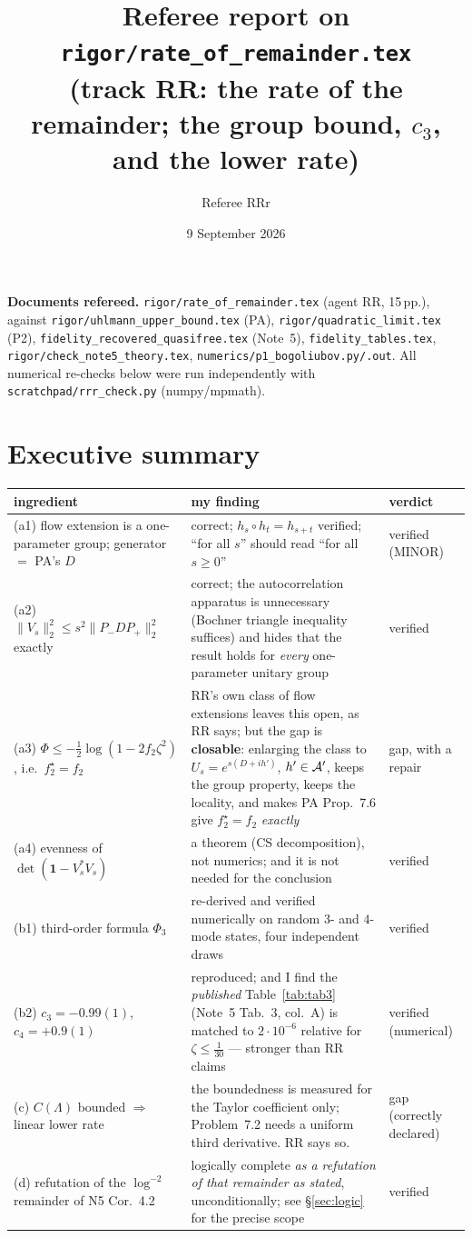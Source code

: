 \documentclass[11pt]{article}
\title{Referee report on \texttt{rigor/rate\_of\_remainder.tex}\\
\large (track RR: the rate of the remainder; the group bound, $c_3$, and the lower rate)}
\author{Referee RRr}\date{9 September 2026}
\newcommand{\Pp}{P_+}\newcommand{\Pm}{P_-}\newcommand{\Om}{\Omega}\newcommand{\one}{\mathbf 1}
\newcommand{\norm}[1]{\lVert#1\rVert}\newcommand{\abs}[1]{\lvert#1\rvert}
\begin{document}
\maketitle

\noindent\textbf{Documents refereed.}  \texttt{rigor/rate\_of\_remainder.tex} (agent RR, 15\,pp.),
against \texttt{rigor/uhlmann\_upper\_bound.tex} (PA), \texttt{rigor/quadratic\_limit.tex} (P2),
\texttt{fidelity\_recovered\_quasifree.tex} (Note~5), \texttt{fidelity\_tables.tex},
\texttt{rigor/check\_note5\_theory.tex}, \texttt{numerics/p1\_bogoliubov.py/.out}.  All numerical
re-checks below were run independently with
\texttt{scratchpad/rrr\_check.py} (numpy/mpmath).

\section*{Executive summary}
\begin{center}\small
\begin{tabular}{p{}p{}l}\toprule
ingredient & my finding & verdict\\\midrule
(a1) flow extension is a one-parameter group; generator $=$ PA's $D$ &
 correct; $h_s\circ h_t=h_{s+t}$ verified; ``for all $s$'' should read ``for all $s\ge0$'' &
 verified (MINOR)\\
(a2) $\norm{V_s}_2^2\le s^2\norm{\Pm D\Pp}_2^2$ exactly &
 correct; the autocorrelation apparatus is unnecessary (Bochner triangle inequality suffices) and
 hides that the result holds for \emph{every} one-parameter unitary group & verified\\
(a3) $\Phi\le-\frac12\log(1-2f_2\zeta^2)$, i.e.\ $f_2^\star=f_2$ &
 RR's own class of flow extensions leaves this open, as RR says; but the gap is
 \textbf{closable}: enlarging the class to $U_s=e^{s(D+ih')}$, $h'\in\mathcal A'$, keeps the group property,
 keeps the locality, and makes PA Prop.~7.6 give $f_2^\star=f_2$ \emph{exactly} & gap, with a repair\\
(a4) evenness of $\det(\one-V_s^*V_s)$ & a theorem (CS decomposition), not numerics; and it is not
 needed for the conclusion & verified\\
(b1) third-order formula $\Phi_3$ & re-derived and verified numerically on random $3$- and
 $4$-mode states, four independent draws & verified\\
(b2) $c_3=-0.99(1)$, $c_4=+0.9(1)$ & reproduced; and I find the \emph{published}
 Table~\ref{tab:tab3} (Note~5 Tab.~3, col.~A) is matched to $2\cdot10^{-6}$ relative for
 $\zeta\le\frac1{30}$ --- stronger than RR claims & verified (numerical)\\
(c) $C(\Lambda)$ bounded $\Rightarrow$ linear lower rate & the boundedness is measured for the
 Taylor coefficient only; Problem~7.2 needs a uniform third derivative.  RR says so.  &
 gap (correctly declared)\\
(d) refutation of the $\log^{-2}$ remainder of N5 Cor.~4.2 & logically complete
 \emph{as a refutation of that remainder as stated}, unconditionally; see \S\ref{sec:logic} for the
 precise scope & verified\\
\bottomrule\end{tabular}\end{center}
\end{document}
